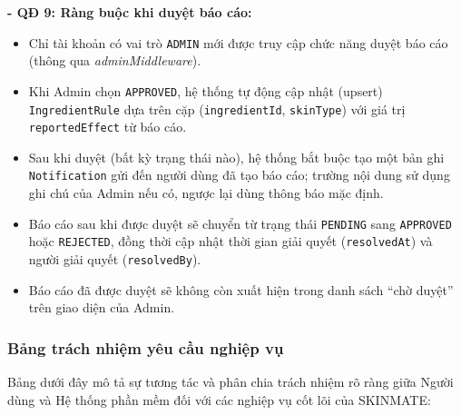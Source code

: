 \documentclass[12pt,a4paper]{article}
\begin{document}
\textbf{- QĐ 9: Ràng buộc khi duyệt báo cáo:}
\begin{itemize}
    \item Chỉ tài khoản có vai trò \texttt{ADMIN} mới được truy cập chức năng duyệt báo cáo (thông qua \textit{adminMiddleware}).
    \item Khi Admin chọn \texttt{APPROVED}, hệ thống tự động cập nhật (upsert) \texttt{IngredientRule} dựa trên cặp (\texttt{ingredientId}, \texttt{skinType}) với giá trị \texttt{reportedEffect} từ báo cáo.
    \item Sau khi duyệt (bất kỳ trạng thái nào), hệ thống bắt buộc tạo một bản ghi \texttt{Notification} gửi đến người dùng đã tạo báo cáo; trường nội dung sử dụng ghi chú của Admin nếu có, ngược lại dùng thông báo mặc định.
    \item Báo cáo sau khi được duyệt sẽ chuyển từ trạng thái \texttt{PENDING} sang \texttt{APPROVED} hoặc \texttt{REJECTED}, đồng thời cập nhật thời gian giải quyết (\texttt{resolvedAt}) và người giải quyết (\texttt{resolvedBy}).
    \item Báo cáo đã được duyệt sẽ không còn xuất hiện trong danh sách “chờ duyệt” trên giao diện của Admin.
\end{itemize}



\subsubsection{Bảng trách nhiệm yêu cầu nghiệp vụ}

Bảng dưới đây mô tả sự tương tác và phân chia trách nhiệm rõ ràng giữa Người dùng và Hệ thống phần mềm đối với các nghiệp vụ cốt lõi của SKINMATE:
\end{document}
